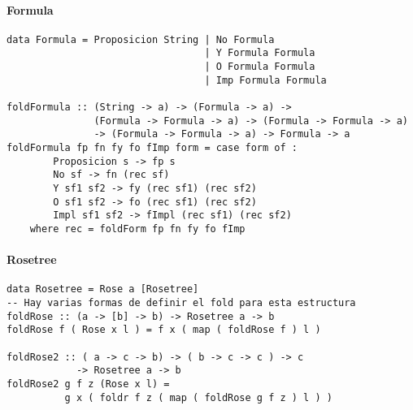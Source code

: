 \paragraph{Formula}
\begin{centrado}
	\begin{verbatim}
data Formula = Proposicion String | No Formula 
                                  | Y Formula Formula
                                  | O Formula Formula
                                  | Imp Formula Formula
                                  
foldFormula :: (String -> a) -> (Formula -> a) -> 
               (Formula -> Formula -> a) -> (Formula -> Formula -> a) 
               -> (Formula -> Formula -> a) -> Formula -> a
foldFormula fp fn fy fo fImp form = case form of :
		Proposicion s -> fp s
		No sf -> fn (rec sf)
		Y sf1 sf2 -> fy (rec sf1) (rec sf2)
		O sf1 sf2 -> fo (rec sf1) (rec sf2)
		Impl sf1 sf2 -> fImpl (rec sf1) (rec sf2)
	where rec = foldForm fp fn fy fo fImp
	\end{verbatim}
	\end{centrado}

\paragraph{Rosetree}
\begin{centrado}
	\begin{verbatim}
data Rosetree = Rose a [Rosetree]
-- Hay varias formas de definir el fold para esta estructura
foldRose :: (a -> [b] -> b) -> Rosetree a -> b
foldRose f ( Rose x l ) = f x ( map ( foldRose f ) l )
	
foldRose2 :: ( a -> c -> b) -> ( b -> c -> c ) -> c 
            -> Rosetree a -> b
foldRose2 g f z (Rose x l) = 
          g x ( foldr f z ( map ( foldRose g f z ) l ) )
		
\end{verbatim}
\end{centrado}
